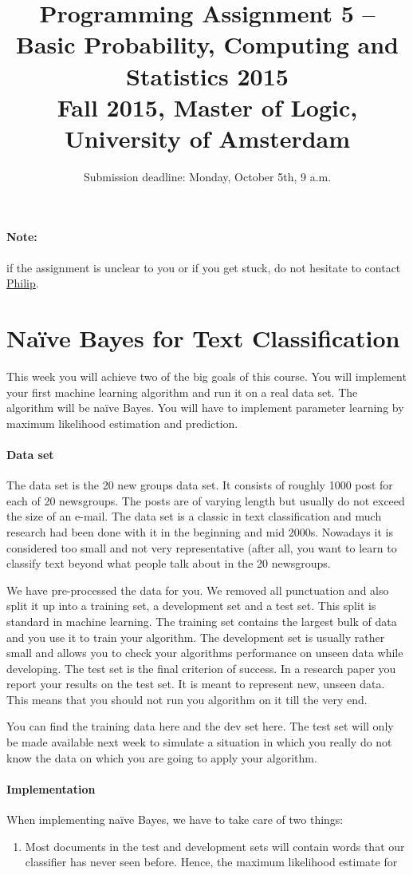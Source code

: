 \documentclass[11pt, leqno, a4paper]{article}
\title{Programming Assignment 5 -- Basic Probability, Computing and Statistics 2015 \\[2mm]
\large{Fall 2015, Master of Logic, University of Amsterdam}}
\author{}
\date{Submission deadline: Monday, October 5th, 9 a.m.}
\begin{document}
\maketitle

\paragraph{Note:} if the assignment is unclear to you or if you get stuck, do not hesitate to contact \href{mailto:P.Schulz@uva.nl}{Philip}.

\section{Na\"ive Bayes for Text Classification}

This week you will achieve two of the big goals of this course. You will implement your first machine 
learning algorithm and run it on a real data set. The algorithm will be na\"ive Bayes. You will have to 
implement parameter learning by maximum likelihood estimation and prediction. 

\paragraph{Data set} The data set is the 20 new groups data set. It consists of roughly 1000 post for each
of 20 newsgroups. The posts are of varying length but usually do not exceed the size of an e-mail. The
data set is a classic in text classification and much research had been done with it in the beginning and
mid 2000s. Nowadays it is considered too small and not very representative (after all, you want to learn
to classify text beyond what people talk about in the 20 newsgroups.

We have pre-processed the data for you. We removed all punctuation and also split it up into a training
set, a development set and a test set. This split is standard in machine learning. The training set contains
the largest bulk of data and you use it to train your algorithm. The development set is usually rather
small and allows you to check your algorithms performance on unseen data while developing. The test set
is the final criterion of success. In a research paper you report your results on the test set. It is meant
to represent new, unseen data. This means that you should not run you algorithm on it till the very end.

You can find the training data here and the dev set here. The test set will only be made available next week
to simulate a situation in which you really do not know the data on which you are going to apply your 
algorithm.

\paragraph{Implementation} When implementing na\"ive Bayes, we have to take care of two things:
\begin{enumerate}
\item Most documents in the test and development sets will contain words that our classifier has never
seen before. Hence, the maximum likelihood estimate for 
\end{enumerate}
\end{document}
